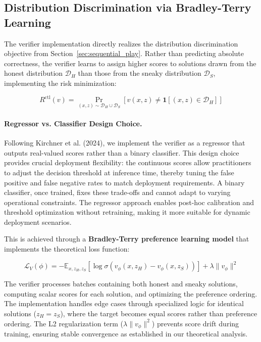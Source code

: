 \subsection{Distribution Discrimination via Bradley-Terry Learning}

The verifier implementation directly realizes the distribution discrimination objective from Section~\ref{sec:sequential_play}. Rather than predicting absolute correctness, the verifier learns to assign higher scores to solutions drawn from the honest distribution $\mathcal{D}_H$ than those from the sneaky distribution $\mathcal{D}_S$, implementing the risk minimization:

$$R^{\text{ctl}}(v) = \Pr_{(x,z) \sim \mathcal{D}_H \cup \mathcal{D}_S} \left[ v(x,z) \neq \mathbf{1}[(x,z) \in \mathcal{D}_H] \right]$$

\paragraph{Regressor vs. Classifier Design Choice.} Following Kirchner et al. (2024), we implement the verifier as a regressor that outputs real-valued scores rather than a binary classifier. This design choice provides crucial deployment flexibility: the continuous scores allow practitioners to adjust the decision threshold at inference time, thereby tuning the false positive and false negative rates to match deployment requirements. A binary classifier, once trained, fixes these trade-offs and cannot adapt to varying operational constraints. The regressor approach enables post-hoc calibration and threshold optimization without retraining, making it more suitable for dynamic deployment scenarios.

This is achieved through a \textbf{Bradley-Terry preference learning model} that implements the theoretical loss function:

$$\mathcal{L}_V(\phi) = -\mathbb{E}_{x,z_H,z_S}\left[\log \sigma(v_\phi(x, z_H) - v_\phi(x, z_S))\right] + \lambda \|v_\phi\|^2$$

The verifier processes batches containing both honest and sneaky solutions, computing scalar scores for each solution, and optimizing the preference ordering. The implementation handles edge cases through specialized logic for identical solutions ($z_H = z_S$), where the target becomes equal scores rather than preference ordering. The L2 regularization term ($\lambda \|v_\phi\|^2$) prevents score drift during training, ensuring stable convergence as established in our theoretical analysis.

